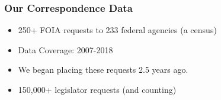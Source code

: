 \documentclass[13pt]{beamer}
\begin{document}
\begin{frame}
\frametitle{Our Correspondence Data}
\Large
\begin{itemize}
\item 250+ FOIA requests to 233 federal agencies (a census)
\item Data Coverage: 2007-2018
\item We began placing these requests 2.5 years ago.
\item 150,000+ legislator requests (and counting)
\end{itemize}
 

\end{frame}
\end{document}
